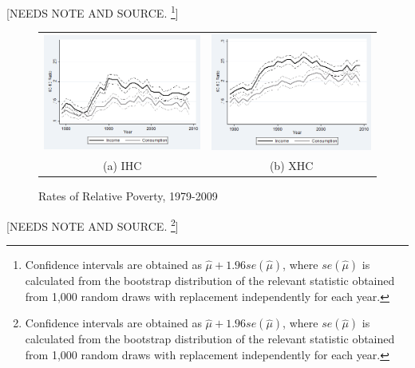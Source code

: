 [NEEDS NOTE AND SOURCE. \footnote{Confidence intervals are obtained as $\hat{\mu} + 1.96se(\hat{\mu})$, where $se(\hat{\mu})$ is calculated from the bootstrap distribution of the relevant statistic obtained from 1,000 random draws with replacement independently for each year.}]


\begin{figure}
\caption{Rates of Relative Poverty, 1979-2009}
\centering
\begin{tabular}{cc}
\includegraphics[width=.5\linewidth]{pictures/ihc_3.png} & \includegraphics[width=.5\linewidth]{pictures/xhc_3.png} \\
(a) IHC & (b) XHC \\
\end{tabular}
\label{fig:pov_trends}
\end{figure}


[NEEDS NOTE AND SOURCE. \footnote{Confidence intervals are obtained as $\hat{\mu} + 1.96se(\hat{\mu})$, where $se(\hat{\mu})$ is calculated from the bootstrap distribution of the relevant statistic obtained from 1,000 random draws with replacement independently for each year.}]

